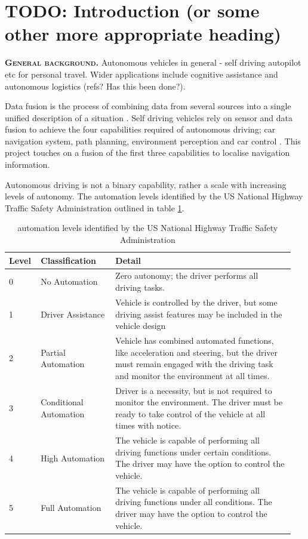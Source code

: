 \documentclass[]{aiaa-tc}%
\begin{document}
\newpage
\section{TODO: Introduction (or some other more appropriate heading)} \label{sect:intro}


\lettrine[nindent=0pt]{\textbf{G}}{\textbf{eneral background.}} Autonomous vehicles in general - self driving autopilot etc for personal travel. Wider applications include cognitive assistance and autonomous logistics (refs? Has this been done?). 


Data fusion is the process of combining data from several sources into a single unified description of a situation \citep{gpsInsFusion}. Self driving vehicles rely on sensor and data fusion to achieve the four capabilities required of autonomous driving; car navigation system, path planning, environment perception and car control \citep{keyTechSelfDriving}. This project touches on a fusion of the first three capabilities to localise navigation information. 

Autonomous driving is not a binary capability, rather a scale with increasing levels of autonomy. The automation levels identified by the US National Highway Traffic Safety Administration \citep{automationVisionForSafety} outlined in table \ref{t:automationLevels}.

\begin{table}%
 \begin{center}
  \caption{automation levels identified by the US National Highway Traffic Safety Administration \citep{automationVisionForSafety}}
  \label{t:automationLevels}
  \begin{tabular}{p{0.1\linewidth}p{0.25\linewidth}p{0.6\linewidth}}
       Level & Classification & Detail\\\hline
        0 &  No Automation & Zero autonomy; the driver performs all driving tasks. \\
       1 &  Driver Assistance & Vehicle is controlled by the driver, but some driving assist features may be included in the vehicle design \\
       2 &  Partial Automation & Vehicle has combined automated functions, like acceleration and steering, but the driver must remain engaged with the driving task and monitor the environment at all times. \\
       3 &  Conditional Automation &   Driver is a necessity, but is not required to monitor the environment. The driver must be ready to take control of the vehicle at all times with notice. \\
      4 &  High Automation &   The vehicle is capable of performing all driving functions under certain conditions. The driver may have the option to control the vehicle. \\
      5 &   Full Automation &   The vehicle is capable of performing all driving functions under all conditions. The driver may have the option to control the vehicle. 
  \end{tabular}
 \end{center}
\end{table}
\end{document}
